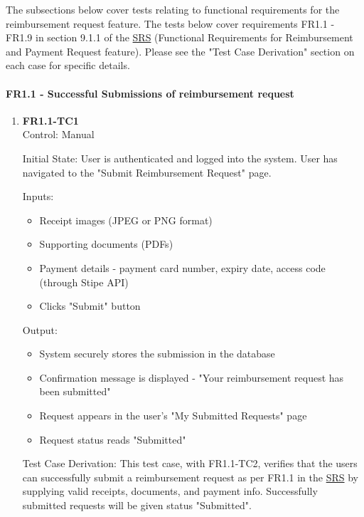 \documentclass[12pt, titlepage]{article}
\begin{document}
The subsections below cover tests relating to functional requirements for the reimbursement request feature. The tests below cover requirements FR1.1 - FR1.9 in section 9.1.1 of the \href{https://shorturl.at/FdAgR}{SRS} (Functional Requirements for Reimbursement and Payment Request feature). Please see the "Test Case Derivation" section on each case for specific details.
		
\paragraph{FR1.1 - Successful Submissions of reimbursement request}

\begin{enumerate}

\item{\textbf{FR1.1-TC1}\\}
\hypertarget{FR1.1-TC1}{}
Control: Manual
					
Initial State: User is authenticated and logged into the system. User has navigated to the "Submit Reimbursement Request" page.
					
Inputs:
\begin{itemize}
    \item Receipt images (JPEG or PNG format)
    \item Supporting documents (PDFs)
    \item Payment details - payment card number, expiry date, access code (through Stipe API)
    \item Clicks "Submit" button
\end{itemize}
					
Output: 
\begin{itemize}
    \item System securely stores the submission in the database
    \item Confirmation message is displayed - "Your reimbursement request has been submitted"
    \item Request appears in the user's "My Submitted Requests" page
    \item Request status reads "Submitted"
\end{itemize}

Test Case Derivation: This test case, with FR1.1-TC2, verifies that the users can successfully submit a reimbursement request as per FR1.1 in the \href{https://shorturl.at/FdAgR}{SRS} by supplying valid receipts, documents, and payment info. Successfully submitted requests will be given status "Submitted".
					

\end{enumerate}
\end{document}
